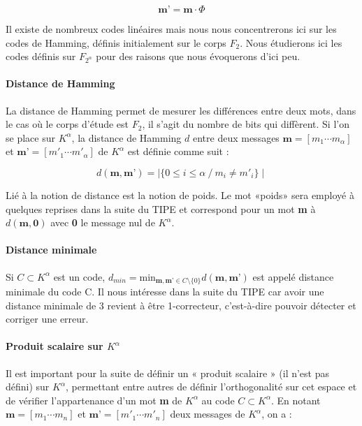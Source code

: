 \documentclass[10pt]{article}
\begin{document}
\begin{displaymath}
\textbf{m'}= \textbf{m} \cdot \Phi
\end{displaymath}

Il existe de nombreux codes linéaires mais nous nous concentrerons ici sur les codes de Hamming, définis initialement sur le corps $F_{2}$. Nous étudierons ici les codes définis sur $F_{2^{\alpha}}$ pour des raisons que nous évoquerons d'ici peu.

\paragraph{Distance de Hamming}
La distance de Hamming permet de mesurer les différences entre deux mots, dans le cas où le corps d'étude est $F_{2}$, il s'agit du nombre de bits qui diffèrent. Si l'on se place sur $K^{\alpha}$, la distance de Hamming $d$ entre deux messages $\textbf{m}=[ m_1 \cdots m_{\alpha} ] $ et $\textbf{m'}=[ m'_1 \cdots m'_{\alpha} ] $ de $K^{\alpha}$ est définie comme suit :

\begin{displaymath}
d(\textbf{m},\textbf{m'})=\mid \lbrace 0\leq i \leq \alpha \  / \ m_i \neq m'_i \rbrace \mid
\end{displaymath}

Lié à la notion de distance est la notion de poids. Le mot «poids» sera employé à quelques reprises dans la suite du TIPE et correspond pour un mot \textbf{m} à $d(\textbf{m},\textbf{0})$ avec \textbf{0} le message nul de $K^{\alpha}$.

\paragraph{Distance minimale} Si $C \subset K^{\alpha}$ est un code, $d_{min} = \text{min}_{\textbf{m},\textbf{m'} \in C \setminus \lbrace{0}\rbrace} d(\textbf{m}, \textbf{m'})$ est appelé distance minimale du code C. Il nous intéresse dans la suite du TIPE car avoir une distance minimale de 3 revient à être 1-correcteur, c'est-à-dire pouvoir détecter et corriger une erreur.

\paragraph{Produit scalaire sur $K^{\alpha}$}
Il est important pour la suite de définir un « produit scalaire » (il n'est pas défini) sur $K^{\alpha}$, permettant entre autres de définir l'orthogonalité sur cet espace et de vérifier l'appartenance d'un mot \textbf{m} de $K^{\alpha}$ au code $C \subset K^{\alpha}$. En notant $\textbf{m}=[ m_1 \cdots m_n ] $ et $\textbf{m'}=[ m'_1 \cdots m'_n ] $ deux messages de $K^{\alpha}$, on a :
\end{document}
